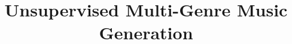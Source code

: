 \documentclass{article}
\begin{document}
\title{Unsupervised Multi-Genre Music Generation}
\maketitle
\end{document}
